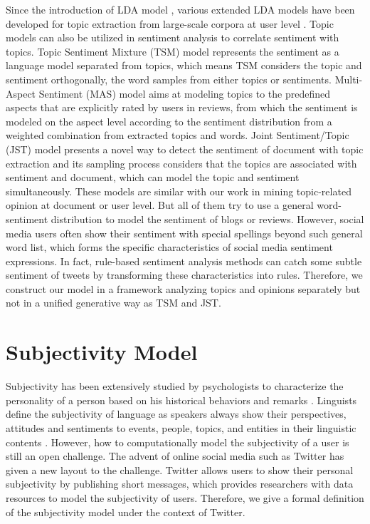 \documentclass{acm_proc_article-sp}
\begin{document}
Since the introduction of LDA model \cite{blei2003latent}, various extended LDA models have been developed for topic extraction from large-scale corpora at user level \cite{rosen2004author,ramage2009labeled}. Topic models can also be utilized in sentiment analysis to correlate sentiment with topics. Topic Sentiment Mixture (TSM) model \cite{mei2007topic} represents the sentiment as a language model separated from topics, which means TSM considers the topic and sentiment orthogonally, the word samples from either topics or sentiments. Multi-Aspect Sentiment (MAS) model \cite{zhao2012user} aims at modeling topics to the predefined aspects that are explicitly rated by users in reviews, from which the sentiment is modeled on the aspect level according to the sentiment distribution from a weighted combination from extracted topics and words. Joint Sentiment/Topic (JST) model \cite{lin2009joint} presents a novel way to detect the sentiment of document with topic extraction and its sampling process considers that the topics are associated with sentiment and document, which can model the topic and sentiment simultaneously. These models are similar with our work in mining topic-related opinion at document or user level. But all of them try to use a general word-sentiment distribution to model the sentiment of blogs or reviews. However, social media users often show their sentiment with special spellings beyond such general word list, which forms the specific characteristics of social media sentiment expressions. In fact, rule-based sentiment analysis methods can catch some subtle sentiment of tweets by transforming these characteristics into rules. Therefore, we construct our model in a framework analyzing topics and opinions separately but not in a unified generative way as TSM and JST. 

\section{Subjectivity Model}
\label{subjectivemodel}

Subjectivity has been extensively studied by psychologists to characterize the personality of a person based on his historical behaviors and remarks \cite{engbert2007agency}. 
Linguists define the subjectivity of language as speakers always show their perspectives, attitudes and sentiments to events, people, topics, and entities in their linguistic contents \cite{stein2005subjectivity}. 
However, how to computationally model the subjectivity of a user is still an open challenge. 
The advent of online social media such as Twitter has given a new layout to the challenge.  
Twitter allows users to show their personal subjectivity by publishing short messages, which provides researchers with data resources to model the subjectivity of users.
Therefore, we give a formal definition of the subjectivity model under the context of Twitter.
\end{document}
